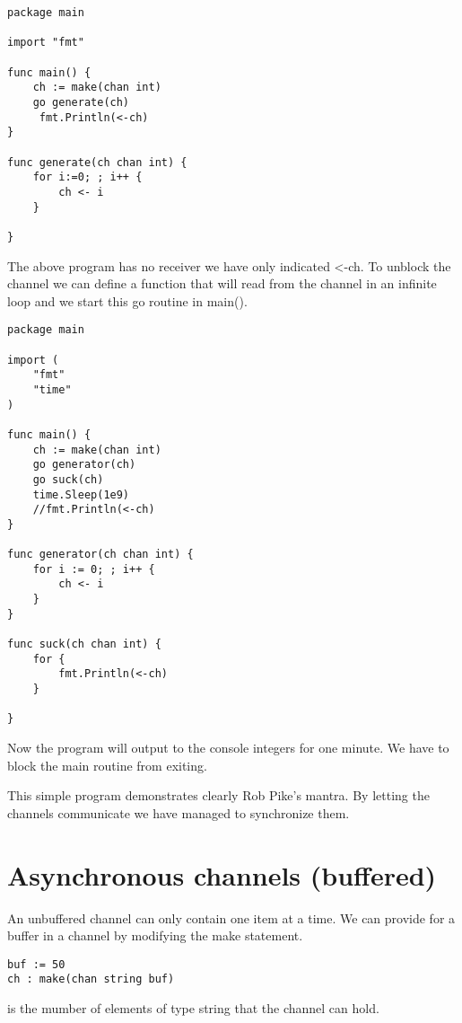 \begin{verbatim}
package main

import "fmt"

func main() {
    ch := make(chan int)
    go generate(ch)
	 fmt.Println(<-ch)
}

func generate(ch chan int) {
    for i:=0; ; i++ {
        ch <- i
    }

}
\end{verbatim}

The above program has no receiver we have only indicated <-ch. To unblock the channel we can define a function that will read from the channel in an infinite loop and we start this go routine in main(). 


\begin{lstlisting}
package main

import (
	"fmt"
	"time"
)

func main() {
	ch := make(chan int)
	go generator(ch)
	go suck(ch)
	time.Sleep(1e9)
	//fmt.Println(<-ch)
}

func generator(ch chan int) {
	for i := 0; ; i++ {
		ch <- i
	}
}

func suck(ch chan int) {
	for {
		fmt.Println(<-ch)
	}
	
}

\end{lstlisting}

Now the program will output to the console integers for one minute. We have to block the main routine from exiting.

This simple program demonstrates clearly Rob Pike's mantra. By letting the channels communicate we have managed to synchronize them.


\section{Asynchronous channels (buffered)}

An unbuffered channel can only contain one item at a time. We can provide for a buffer in a channel by modifying the make statement.


\begin{lstlisting}
buf := 50
ch : make(chan string buf)
\end{lstlisting}

 is the mumber of elements of type string that the channel can hold.







